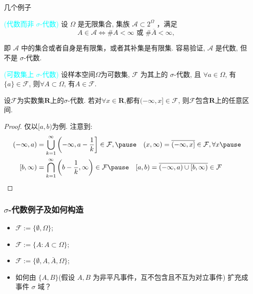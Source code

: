 \begin{frame}{几个例子}
	\begin{exam}\textcolor{cyan}{(代数而非 ${\sigma}$-代数)} 设 ${\Omega}$ 是无限集合, 集族 ${\mathcal{A} \subset 2^{\Omega}}$ ，满足
		\[
		A \in \mathcal{A} \Longleftrightarrow \# A<\infty \text { 或  }  \# \overline{A}<\infty \text {, }
		\]

		即 ${\mathcal{A}}$ 中的集合或者自身是有限集，或者其补集是有限集.
		容易验证, ${\mathcal{A}}$ 是代数, 但不是 ${\sigma}$-代数.
	\end{exam}
\pause
\vspace{0.1cm}
\begin{exam}
	\textcolor{cyan}{(可数集上 ${\sigma}$-代数)} 设样本空间${\Omega}$为可数集, ${\mathcal{F}}$ 为其上的 ${\sigma}$-代数, 且 ${\forall a \in \Omega}$, 有 ${\{a\} \in \mathcal{F}}$, 则${\forall A \subset \Omega}$, 有${A \in \mathcal{F}}$.
\end{exam}

\begin{exam}设${\mathcal{F}}$为实数集${\mathbf{R}}$上的${\sigma}$-代数. 若对${\forall x\in\mathbf{R}}$,都有${(-\infty,x]\in\mathcal{F}}$, 则${\mathcal{F}}$包含${\mathbf{R}}$上的任意区间.
\end{exam}
\pause

\vspace{0.1cm}

\begin{proof}
	仅以${[a,b)}$为例. 注意到:%
	\begin{align*}
		(-\infty, a)&=\bigcup_{k=1}^{\infty}\left(-\infty, a-\frac{1}{k}\right] \in \mathcal{F},  \pause \quad (x, \infty)=\overline{(-\infty, x]} \in \mathcal{F},  \forall x \pause \\
		[b, \infty)&=\bigcap_{k=1}^{\infty}\left(b-\frac{1}{k}, \infty\right) \in \mathcal{F}  \pause \quad	 	[a, b)=\overline{(-\infty, a) \cup [b, \infty)} \in \mathcal{F}
	\end{align*}


\end{proof}



\end{frame}





\begin{frame}
	\frametitle{$\sigma$-代数例子及如何构造}
	\begin{itemize}[<+-|alert@+>]
		\item $\mathcal{F}:=\{\emptyset, \Omega\}$;
		\item $\mathcal{F}:=\{A:A\subset \Omega\}$;
		\item $\mathcal{F}:=\{\emptyset, A, \bar{A}, \Omega\}$;
		\item 如何由 $\{A,B\}$(假设 $A,B$ 为非平凡事件，互不包含且不互为对立事件) 扩充成事件 $\sigma$ 域？
	\end{itemize}
\end{frame}

